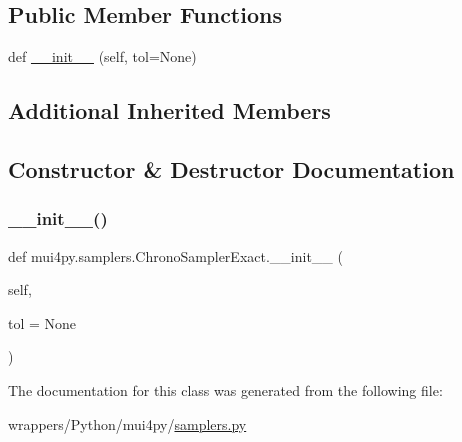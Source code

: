 \subsection*{Public Member Functions}
\begin{DoxyCompactItemize}
\item 
def \hyperlink{classmui4py_1_1samplers_1_1_chrono_sampler_exact_a501d6cb861ae9e330a15a1a46a894a44}{\+\_\+\+\_\+init\+\_\+\+\_\+} (self, tol=None)
\end{DoxyCompactItemize}
\subsection*{Additional Inherited Members}


\subsection{Constructor \& Destructor Documentation}
\mbox{\label{classmui4py_1_1samplers_1_1_chrono_sampler_exact_a501d6cb861ae9e330a15a1a46a894a44}} 
\subsubsection{\texorpdfstring{\+\_\+\+\_\+init\+\_\+\+\_\+()}{\_\_init\_\_()}}
{\footnotesize\ttfamily def mui4py.\+samplers.\+Chrono\+Sampler\+Exact.\+\_\+\+\_\+init\+\_\+\+\_\+ (\begin{DoxyParamCaption}\item[{}]{self,  }\item[{}]{tol = {\ttfamily None} }\end{DoxyParamCaption})}



The documentation for this class was generated from the following file\+:\begin{DoxyCompactItemize}
\item 
wrappers/\+Python/mui4py/\hyperlink{samplers_8py}{samplers.\+py}\end{DoxyCompactItemize}
